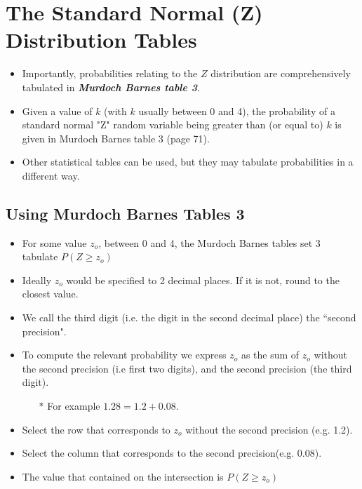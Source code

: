 
\section*{The Standard Normal (Z) Distribution Tables}
\begin{itemize}


\item Importantly, probabilities relating to the $Z$ distribution are comprehensively tabulated in \textbf{\emph{Murdoch Barnes table 3}}.


\item Given a value of $k$ (with $k$ usually between 0 and 4), the probability of a standard normal "Z" random variable being greater than (or equal to) $k$ is given in Murdoch Barnes table 3 (page 71).

\item Other statistical tables can be used, but they may tabulate probabilities in a different way.
\end{itemize}

\subsection*{Using Murdoch Barnes Tables 3}
\begin{itemize}
\item For some value $z_o$, between 0 and 4, the Murdoch Barnes tables set 3 tabulate $P(Z \geq z_o)$
\item Ideally $z_o$ would be specified to 2 decimal places. If it is not, round to the closest value.
\item We call the third digit (i.e. the digit in the second decimal place) the ``second precision".
\end{itemize}


\begin{itemize}
\item To compute the relevant probability we express $z_o$ as the sum of $z_o$ without the second precision (i.e first two digits), and the second precision (the third digit).
\begin{itemize}
\item[$\ast$] For example $1.28 = 1.2 + 0.08$.
\end{itemize}
\item Select the row that corresponds to $z_o$ without the second precision (e.g. 1.2).
\item Select the column that corresponds to the second precision(e.g. 0.08).
\item The value that contained on the intersection is $P(Z \geq z_o)$
\end{itemize}
